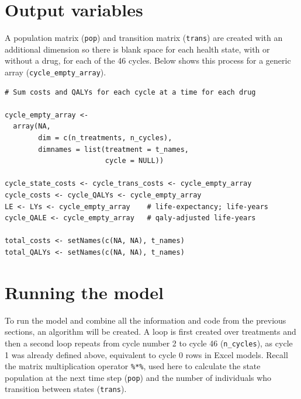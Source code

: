 \section{Output variables}
A population matrix (\texttt{pop}) and transition matrix (\texttt{trans}) are created with an additional dimension so there is blank space for each health state, with or without a drug, for each of the 46 cycles. Below shows this process for a generic array (\texttt{cycle\_empty\_array}).

\begin{verbatim}
# Sum costs and QALYs for each cycle at a time for each drug 

cycle_empty_array <-
  array(NA,
        dim = c(n_treatments, n_cycles),
        dimnames = list(treatment = t_names,
                        cycle = NULL))

cycle_state_costs <- cycle_trans_costs <- cycle_empty_array
cycle_costs <- cycle_QALYs <- cycle_empty_array
LE <- LYs <- cycle_empty_array    # life-expectancy; life-years
cycle_QALE <- cycle_empty_array   # qaly-adjusted life-years

total_costs <- setNames(c(NA, NA), t_names)
total_QALYs <- setNames(c(NA, NA), t_names)
\end{verbatim}

\section{Running the model}
To run the model and combine all the information and code from the previous sections, an algorithm will be created.
A loop is first created over treatments and then a second loop repeats from cycle number 2 to cycle 46 (\texttt{n\_cycles}), as cycle 1 was already defined above, equivalent to cycle 0 rows in Excel models. Recall the matrix multiplication operator \texttt{\%*\%}, used here to calculate the state population at the next time step (\texttt{pop}) and the number of individuals who transition between states (\texttt{trans}).

